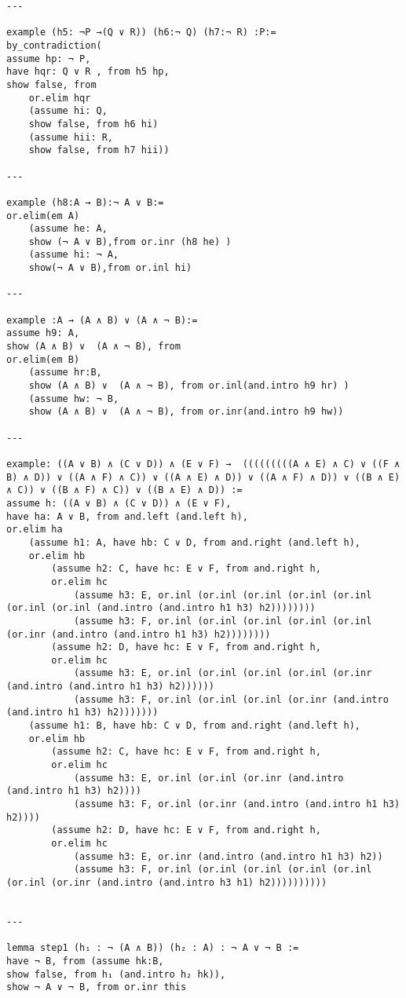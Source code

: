 \begin{lstlisting}
---

example (h5: ¬P →(Q ∨ R)) (h6:¬ Q) (h7:¬ R) :P:=
by_contradiction(
assume hp: ¬ P,
have hqr: Q ∨ R , from h5 hp,
show false, from
    or.elim hqr
    (assume hi: Q,
    show false, from h6 hi)
    (assume hii: R,
    show false, from h7 hii))

---

example (h8:A → B):¬ A ∨ B:=
or.elim(em A)
    (assume he: A,
    show (¬ A ∨ B),from or.inr (h8 he) )
    (assume hi: ¬ A,
    show(¬ A ∨ B),from or.inl hi)

---

example :A → (A ∧ B) ∨ (A ∧ ¬ B):=
assume h9: A,
show (A ∧ B) ∨  (A ∧ ¬ B), from
or.elim(em B)
    (assume hr:B,
    show (A ∧ B) ∨  (A ∧ ¬ B), from or.inl(and.intro h9 hr) )
    (assume hw: ¬ B,
    show (A ∧ B) ∨  (A ∧ ¬ B), from or.inr(and.intro h9 hw))

---

example: ((A ∨ B) ∧ (C ∨ D)) ∧ (E ∨ F) →  (((((((((A ∧ E) ∧ C) ∨ ((F ∧ B) ∧ D)) ∨ ((A ∧ F) ∧ C)) ∨ ((A ∧ E) ∧ D)) ∨ ((A ∧ F) ∧ D)) ∨ ((B ∧ E) ∧ C)) ∨ ((B ∧ F) ∧ C)) ∨ ((B ∧ E) ∧ D)) :=
assume h: ((A ∨ B) ∧ (C ∨ D)) ∧ (E ∨ F),
have ha: A ∨ B, from and.left (and.left h),
or.elim ha
    (assume h1: A, have hb: C ∨ D, from and.right (and.left h),
    or.elim hb
        (assume h2: C, have hc: E ∨ F, from and.right h,
        or.elim hc
            (assume h3: E, or.inl (or.inl (or.inl (or.inl (or.inl (or.inl (or.inl (and.intro (and.intro h1 h3) h2))))))))
            (assume h3: F, or.inl (or.inl (or.inl (or.inl (or.inl (or.inr (and.intro (and.intro h1 h3) h2))))))))
        (assume h2: D, have hc: E ∨ F, from and.right h,
        or.elim hc
            (assume h3: E, or.inl (or.inl (or.inl (or.inl (or.inr (and.intro (and.intro h1 h3) h2))))))
            (assume h3: F, or.inl (or.inl (or.inl (or.inr (and.intro (and.intro h1 h3) h2)))))))
    (assume h1: B, have hb: C ∨ D, from and.right (and.left h),
    or.elim hb
        (assume h2: C, have hc: E ∨ F, from and.right h,
        or.elim hc
            (assume h3: E, or.inl (or.inl (or.inr (and.intro (and.intro h1 h3) h2))))
            (assume h3: F, or.inl (or.inr (and.intro (and.intro h1 h3) h2))))
        (assume h2: D, have hc: E ∨ F, from and.right h,
        or.elim hc
            (assume h3: E, or.inr (and.intro (and.intro h1 h3) h2))
            (assume h3: F, or.inl (or.inl (or.inl (or.inl (or.inl (or.inl (or.inr (and.intro (and.intro h3 h1) h2))))))))))


---

lemma step1 (h₁ : ¬ (A ∧ B)) (h₂ : A) : ¬ A ∨ ¬ B :=
have ¬ B, from (assume hk:B,
show false, from h₁ (and.intro h₂ hk)),
show ¬ A ∨ ¬ B, from or.inr this


\end{lstlisting}
